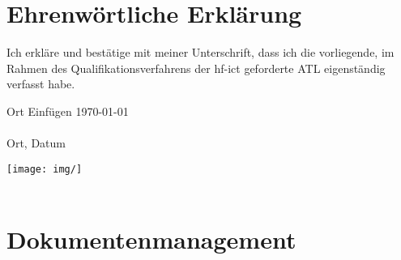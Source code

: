 \section{Ehrenwörtliche Erklärung}
    Ich erkläre und bestätige mit meiner Unterschrift, dass ich die vorliegende, im Rahmen des Qualifikationsverfahrens der hf-ict geforderte ATL eigenständig verfasst habe. 
\vspace{1mm}

\begin{minipage}[t]{5cm}
        \centering Ort Einfügen \today\\
        \centering \dotfill \\
        Ort, Datum
    \end{minipage}
\hfill
    \begin{minipage}[t]{5cm}
        \centering \texttt{[image: img/]} \\%
        \centering \dotfill \\
        \runauthor
    \end{minipage}
    
\section{Dokumentenmanagement}
 
    \begin{table}[!htb]
    \centering
{}
\end{table}
